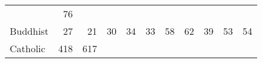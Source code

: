\documentclass[]{article}
\begin{document}
\begin{longtable}[]{@{}lrrrrrrrrrr@{}}
\begin{minipage}[t]{0.04\columnwidth}
\end{minipage} & \begin{minipage}[t]{0.11\columnwidth}\raggedleft\strut
76\strut
\end{minipage}\tabularnewline
\begin{minipage}[t]{0.14\columnwidth}\raggedright\strut
Buddhist\strut
\end{minipage} & \begin{minipage}[t]{0.04\columnwidth}\raggedleft\strut
27\strut
\end{minipage} & \begin{minipage}[t]{0.05\columnwidth}\raggedleft\strut
21\strut
\end{minipage} & \begin{minipage}[t]{0.05\columnwidth}\raggedleft\strut
30\strut
\end{minipage} & \begin{minipage}[t]{0.05\columnwidth}\raggedleft\strut
34\strut
\end{minipage} & \begin{minipage}[t]{0.05\columnwidth}\raggedleft\strut
33\strut
\end{minipage} & \begin{minipage}[t]{0.05\columnwidth}\raggedleft\strut
58\strut
\end{minipage} & \begin{minipage}[t]{0.06\columnwidth}\raggedleft\strut
62\strut
\end{minipage} & \begin{minipage}[t]{0.06\columnwidth}\raggedleft\strut
39\strut
\end{minipage} & \begin{minipage}[t]{0.04\columnwidth}\raggedleft\strut
53\strut
\end{minipage} & \begin{minipage}[t]{0.11\columnwidth}\raggedleft\strut
54\strut
\end{minipage}\tabularnewline
\begin{minipage}[t]{0.14\columnwidth}\raggedright\strut
Catholic\strut
\end{minipage} & \begin{minipage}[t]{0.04\columnwidth}\raggedleft\strut
418\strut
\end{minipage} & \begin{minipage}[t]{0.05\columnwidth}\raggedleft\strut
617\strut
\end{minipage} & \begin{minipage}[t]{0.05\columnwidth}\raggedleft\strut

\end{minipage}
\end{longtable}
\end{document}
